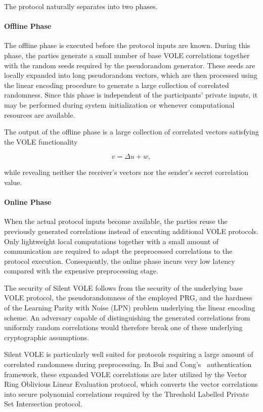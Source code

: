 \documentclass[11pt,a4paper]{article}
\begin{document}
The protocol naturally separates into two phases.

\paragraph{Offline Phase}

The offline phase is executed before the protocol inputs are known. During
this phase, the parties generate a small number of base VOLE
correlations together with the random seeds required by the
pseudorandom generator. These seeds are locally expanded into long
pseudorandom vectors, which are then processed using the linear encoding
procedure to generate a large collection of correlated randomness. Since
this phase is independent of the participants' private inputs, it may be
performed during system initialization or whenever computational
resources are available.

The output of the offline phase is a large collection of correlated
vectors satisfying the VOLE functionality

\[
v=\Delta u+w,
\]

while revealing neither the receiver's vectors nor the sender's secret
correlation value.

\paragraph{Online Phase}

When the actual protocol inputs become available, the parties reuse the
previously generated correlations instead of executing additional VOLE
protocols. Only lightweight local computations together with a small
amount of communication are required to adapt the preprocessed
correlations to the protocol execution. Consequently, the online phase
incurs very low latency compared with the expensive preprocessing stage.

The security of Silent VOLE follows from the security of the underlying
base VOLE protocol, the pseudorandomness of the employed PRG, and the
hardness of the Learning Parity with Noise (LPN) problem underlying the
linear encoding scheme. An adversary capable of distinguishing the
generated correlations from uniformly random correlations would therefore
break one of these underlying cryptographic assumptions.

Silent VOLE is particularly well suited for protocols requiring a large
amount of correlated randomness during preprocessing. In Bui and Cong's~\cite{BuiCong25}
authentication framework, these expanded VOLE correlations are later
utilized by the Vector Ring Oblivious Linear Evaluation protocol, which
converts the vector correlations into secure polynomial correlations
required by the Threshold Labelled Private Set Intersection protocol.
\end{document}
